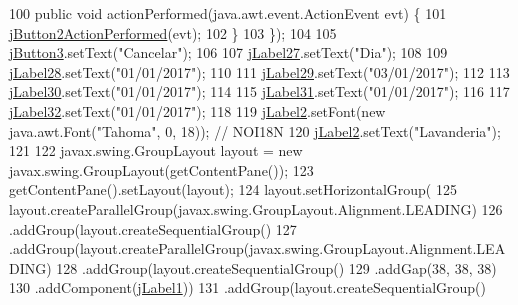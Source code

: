 \begin{DoxyCode}
100             \textcolor{keyword}{public} \textcolor{keywordtype}{void} actionPerformed(java.awt.event.ActionEvent evt) \{
101                 \mbox{\hyperlink{classinterfacessoguar_1_1paenrique_a34ea7075cb88cd57a469832b7fa53e7f}{jButton2ActionPerformed}}(evt);
102             \}
103         \});
104 
105         \mbox{\hyperlink{classinterfacessoguar_1_1paenrique_ac5655995cee95415c5fa0bfd6eb58b49}{jButton3}}.setText(\textcolor{stringliteral}{"Cancelar"});
106 
107         \mbox{\hyperlink{classinterfacessoguar_1_1paenrique_a2f3f435766dfa8d25ce72db778454f41}{jLabel27}}.setText(\textcolor{stringliteral}{"Dia"});
108 
109         \mbox{\hyperlink{classinterfacessoguar_1_1paenrique_ac87555268164c8333fa21ca04c5cb402}{jLabel28}}.setText(\textcolor{stringliteral}{"01/01/2017"});
110 
111         \mbox{\hyperlink{classinterfacessoguar_1_1paenrique_acb0b1be4c242fe2664aef099461f11b3}{jLabel29}}.setText(\textcolor{stringliteral}{"03/01/2017"});
112 
113         \mbox{\hyperlink{classinterfacessoguar_1_1paenrique_a592d4e690f30eaa5c1c7626271d513f2}{jLabel30}}.setText(\textcolor{stringliteral}{"01/01/2017"});
114 
115         \mbox{\hyperlink{classinterfacessoguar_1_1paenrique_a9a9d32bd5f42fadfd293170415a4ebae}{jLabel31}}.setText(\textcolor{stringliteral}{"01/01/2017"});
116 
117         \mbox{\hyperlink{classinterfacessoguar_1_1paenrique_a3b351505fc92b75748aed4174668f4c0}{jLabel32}}.setText(\textcolor{stringliteral}{"01/01/2017"});
118 
119         \mbox{\hyperlink{classinterfacessoguar_1_1paenrique_a213ee92d0638dee5a178c9c6fcc5befc}{jLabel2}}.setFont(\textcolor{keyword}{new} java.awt.Font(\textcolor{stringliteral}{"Tahoma"}, 0, 18)); \textcolor{comment}{// NOI18N}
120         \mbox{\hyperlink{classinterfacessoguar_1_1paenrique_a213ee92d0638dee5a178c9c6fcc5befc}{jLabel2}}.setText(\textcolor{stringliteral}{"Lavanderia"});
121 
122         javax.swing.GroupLayout layout = \textcolor{keyword}{new} javax.swing.GroupLayout(getContentPane());
123         getContentPane().setLayout(layout);
124         layout.setHorizontalGroup(
125             layout.createParallelGroup(javax.swing.GroupLayout.Alignment.LEADING)
126             .addGroup(layout.createSequentialGroup()
127                 .addGroup(layout.createParallelGroup(javax.swing.GroupLayout.Alignment.LEADING)
128                     .addGroup(layout.createSequentialGroup()
129                         .addGap(38, 38, 38)
130                         .addComponent(\mbox{\hyperlink{classinterfacessoguar_1_1paenrique_a69df573814db382c28d77ef7064da795}{jLabel1}}))
131                     .addGroup(layout.createSequentialGroup()

\end{DoxyCode}
